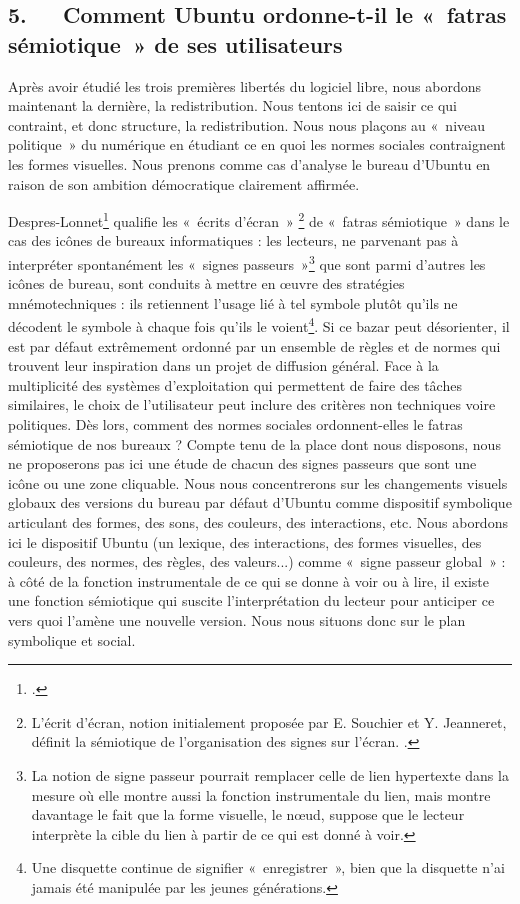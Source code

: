 \documentclass{FramateX}
\begin{document}
\begin{refsection}
\section*{5.~~~Comment Ubuntu ordonne-t-il le «~fatras sémiotique~» de ses utilisateurs}
{}


Après avoir étudié les trois premières libertés du logiciel libre, nous
abordons maintenant la dernière, la redistribution. Nous tentons ici de
saisir ce qui contraint, et donc structure, la redistribution. Nous
nous plaçons au «~niveau politique~» du numérique en étudiant ce en
quoi les normes sociales contraignent les formes visuelles. Nous
prenons comme cas d'analyse le bureau d'Ubuntu en raison de son
ambition démocratique clairement affirmée. 

Despres-Lonnet\footnote{\cite{despres-lonnetecrits2004}.} qualifie les «~écrits d'écran~» \footnote{L'écrit d'écran, notion initialement proposée par E. Souchier et Y. Jeanneret, définit la sémiotique de l'organisation des signes sur l'écran. \cite{souchierlenonciation2005}.} de «~fatras
sémiotique~» dans le cas des icônes de bureaux informatiques : les
lecteurs, ne parvenant pas à interpréter spontanément les «~signes
passeurs~»\footnote{La notion de signe passeur
pourrait remplacer celle de lien hypertexte dans la mesure où elle
montre aussi la fonction instrumentale du lien, mais montre davantage
le fait que la forme visuelle, le nœud, suppose que le lecteur
interprète la cible du lien à partir de ce qui est donné à voir.} que
sont parmi d'autres les icônes de bureau, sont conduits à mettre en
œuvre des stratégies mnémotechniques : ils retiennent l'usage lié à tel
symbole plutôt qu'ils ne décodent le symbole à chaque fois qu'ils le
voient\footnote{Une disquette continue de
signifier «~enregistrer~», bien que la disquette n'ai jamais été
manipulée par les jeunes générations.}. Si ce bazar peut désorienter,
il est par défaut extrêmement ordonné par un ensemble de règles et de
normes qui trouvent leur inspiration dans un projet de diffusion
général. Face à la multiplicité des systèmes d'exploitation qui
permettent de faire des tâches similaires, le choix de l'utilisateur
peut inclure des critères non techniques voire politiques. Dès lors,
comment des normes sociales ordonnent-elles le fatras sémiotique de nos
bureaux ? Compte tenu de la place dont nous disposons, nous ne
proposerons pas ici une étude de chacun des signes passeurs que sont
une icône ou une zone cliquable. Nous nous concentrerons sur les
changements visuels globaux des versions du bureau par défaut d'Ubuntu
comme dispositif symbolique articulant des formes, des sons, des
couleurs, des interactions, etc. Nous abordons ici le dispositif Ubuntu
(un lexique, des interactions, des formes visuelles, des couleurs, des
normes, des règles, des valeurs...) comme «~signe passeur global~» : à
côté de la fonction instrumentale de ce qui se donne à voir ou à lire,
il existe une fonction sémiotique qui suscite l'interprétation du
lecteur pour anticiper ce vers quoi l'amène une nouvelle version. Nous
nous situons donc sur le plan symbolique et social. 


\end{refsection}
\end{document}

